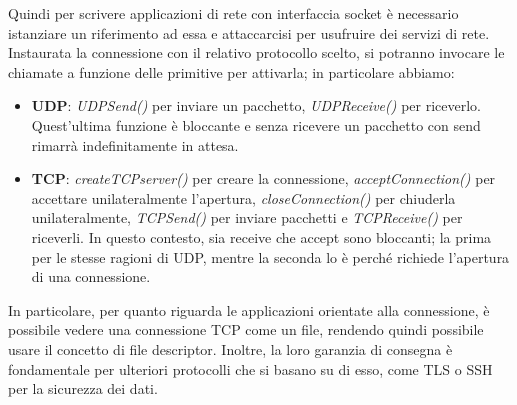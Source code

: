 \noindent Quindi per scrivere applicazioni di rete con interfaccia socket è necessario istanziare un riferimento ad essa e attaccarcisi per usufruire
dei servizi di rete. Instaurata la connessione con il relativo protocollo scelto, si potranno invocare le chiamate a funzione delle primitive per
attivarla; in particolare abbiamo: \begin{itemize}
    \item \textbf{UDP}: \textit{UDPSend()} per inviare un pacchetto, \textit{UDPReceive()} per riceverlo. Quest'ultima funzione è bloccante e senza
    ricevere un pacchetto con send rimarrà indefinitamente in attesa.
    \item \textbf{TCP}: \textit{createTCPserver()} per creare la connessione, \textit{acceptConnection()} per accettare unilateralmente l'apertura,
    \textit{closeConnection()} per chiuderla unilateralmente, \textit{TCPSend()} per inviare pacchetti e \textit{TCPReceive()} per riceverli. In questo
    contesto, sia receive che accept sono bloccanti; la prima per le stesse ragioni di UDP, mentre la seconda lo è perché richiede l'apertura di una
    connessione.
\end{itemize}

\noindent In particolare, per quanto riguarda le applicazioni orientate alla connessione, è possibile vedere una connessione TCP come un file, rendendo
quindi possibile usare il concetto di file descriptor. Inoltre, la loro garanzia di consegna è fondamentale per ulteriori protocolli che si basano su
di esso, come TLS o SSH per la sicurezza dei dati.